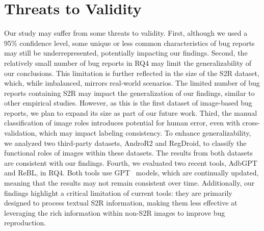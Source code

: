 \section{Threats to Validity}
Our study may suffer from some threats to validity. 
First, although we used a 95\% confidence level, some unique or less common characteristics of bug reports may still be underrepresented, potentially impacting our findings. 
%
Second, the relatively small number of bug reports in RQ4 may limit the generalizability of our conclusions. This limitation is further reflected in the size of the S2R dataset, which, while imbalanced, mirrors real-world scenarios. The limited number of bug reports containing S2R may impact the generalization of our findings, similar to other empirical studies. However, as this is the first dataset of image-based bug reports, we plan to expand its size as part of our future work.
%
Third, the manual classification of image roles introduces potential for human error, even with cross-validation, which may impact labeling consistency. To enhance generalizability, we analyzed two third-party datasets, AndroR2 and RegDroid, to classify the functional roles of images within these datasets. The results from both datasets are consistent with our findings.
%
Fourth, we evaluated two recent tools, AdbGPT and ReBL, in RQ4. Both tools use GPT~\cite{chatgpt} models, which are continually updated, meaning that the results may not remain consistent over time. Additionally, our findings highlight a critical limitation of current tools: they are primarily designed to process textual S2R information, making them less effective at leveraging the rich information within non-S2R images to improve bug reproduction.



%
%

